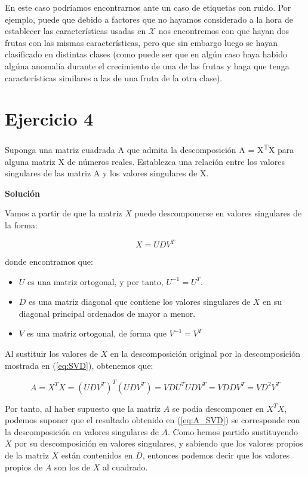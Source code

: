 \documentclass[11pt,a4paper]{article}
\newcommand{\answer}{\noindent\textbf{Solución}}
\begin{document}
En este caso podríamos encontrarnos ante un caso de etiquetas con ruido. Por ejemplo, puede que debido a factores que no
hayamos considerado a la hora de establecer las características usadas en $\mathcal{X}$ nos encontremos con que hayan dos
frutas con las mismas características, pero que sin embargo luego se hayan clasificado en distintas clases (como puede ser
que en algún caso haya habido algúna anomalía durante el crecimiento de una de las frutas y haga que tenga características
similares a las de una fruta de la otra clase).

\section*{Ejercicio 4}

\noindent Suponga una matriz cuadrada A que admita la descomposición A = X\textsuperscript{T}X para alguna matriz X de
números reales. Establezca una relación entre los valores singulares de las matriz A y los valores singulares de X.

\answer

Vamos a partir de que la matriz $X$ puede descomponerse en valores singulares de la forma:

\begin{equation}
\label{eq:SVD}
	X = UDV^T
\end{equation}

\noindent donde encontramos que:

\begin{itemize}[label=\textbullet]
	\item $U$ es una matriz ortogonal, y por tanto, $U^{-1} = U^T$.
	\item $D$ es una matriz diagonal que contiene los valores singulares de $X$ en su diagonal principal ordenados de mayor
	a menor.
	\item $V$ es una matriz ortogonal, de forma que $V^{-1} = V^T$
\end{itemize}

Al sustituir los valores de $X$ en la descomposición original por la descomposición mostrada en (\ref{eq:SVD}), obtenemos que:

\begin{equation}
\label{eq:A_SVD}
	A = X^TX = (UDV^T)^T(UDV^T) = VDU^TUDV^T = VDDV^T = VD^2V^T
\end{equation}

Por tanto, al haber supuesto que la matriz $A$ se podía descomponer en $X^TX$, podemos suponer que el resultado obtenido en
(\ref{eq:A_SVD}) se corresponde con la descomposición en valores singulares de $A$. Como hemos partido sustituyendo $X$ por su
descomposición en valores singulares, y sabiendo que los valores propios de la matriz $X$ están contenidos en $D$, entonces
podemos decir que los valores propios de $A$ son los de $X$ al cuadrado.
\end{document}
